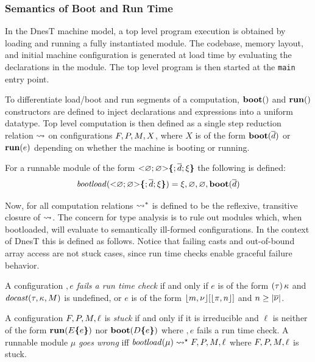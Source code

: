 \declsemanticsfig

\subsubsection{Semantics of Boot and Run Time}

In the DnesT machine model, a top level program execution is obtained by loading and running a
fully instantiated module. The codebase, memory layout, and initial machine configuration is
generated at load time by evaluating the declarations in the module. The top level program is
then started at the \texttt{main} entry point.

To differentiate load/boot and run segments of a computation, $\mathbf{boot}()$ and $\mathbf{run}()$
constructors are defined to inject declarations and expressions into a uniform datatype. Top
level computation is then defined as a single step reduction relation $\leadsto$ on
configurations $F,P,M,X$, where $X$ is of the form $\mathbf{boot}(\overline{d})$ or
$\mathbf{run}(e)$ depending on whether the machine is booting or running.

\begin{definition}
\label{definition-runnable-semantics}
For a runnable module of the form $\mathrm{<}\varnothing; \varnothing \mathrm{>}\textup{\textbf{\{}} ; \overline{d};
\xi\textup{\textbf{\}}}$ the following is defined:
$$
\mathit{bootload}(\mathrm{<}\varnothing; \varnothing \mathrm{>}\textup{\textbf{\{}} ; \overline{d}; \xi\textup{\textbf{\}}}) =
\xi,\varnothing,\varnothing, \mathbf{boot}(\overline{d})
$$
\end{definition}

Now, for all computation relations $\leadsto^*$ is defined to be the reflexive, transitive
closure of $\leadsto$. The concern for type analysis is to rule out modules which, when
bootloaded, will evaluate to semantically ill-formed configurations. In the context of DnesT
this is defined as follows. Notice that failing casts and out-of-bound array access are not
stuck cases, since run time checks enable graceful failure behavior.
\begin{definition}
  \label{definition-runtime-failure}
  A configuration $\bm, e$ \emph{fails a run time check} if and only if $e$ is of the form
  $(\tau)\,\kappa$ and $\mathit{docast}(\tau,\kappa,M)$ is undefined, or $e$ is of the form
  $\lfloor m,{\nu} \rfloor[\lfloor \pi,n \rfloor]$ and $n\ge|\overline{{\nu}}|$.
\end{definition}

\begin{definition}
  \label{definition-stuck}
  A configuration $F, P, M, \ell$ is \emph{stuck} if and only if it is irreducible
  and $\ell$ is neither of the form $\mathbf{run}(E\textup{\textbf{\{}} e\textup{\textbf{\}}})$ nor $\mathbf{boot}(D\textup{\textbf{\{}} e\textup{\textbf{\}}})$
  where $\bm, e$ fails a run time check. A runnable module $\mu$ \emph{goes wrong} iff
  $\mathit{bootload}(\mu) \leadsto^\star F, P, M, \ell $ where $F, P, M, \ell$
  is stuck.
\end{definition}

